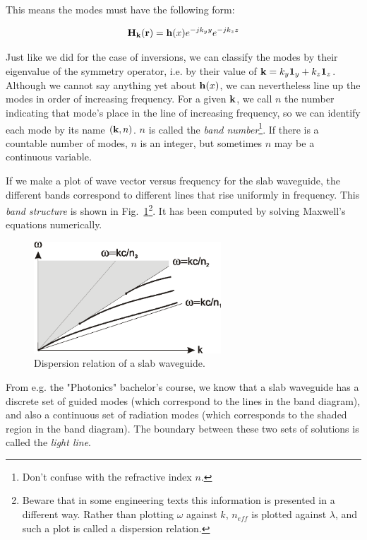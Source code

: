 This means the modes must have the following form:

\begin{equation}
{\bf H}_{\bf k}({\bf r}) = {\bf h}(x) e^{-j k_y y} e^{-j k_z z} 
\end{equation} 

Just like we did for the case of inversions, we can classify the modes by their eigenvalue of the symmetry operator, i.e. by their value of ${\bf k} = k_y {\bf 1}_y + k_z {\bf 1}_z$. Although we cannot say anything yet about ${\bf h}(x)$, we can nevertheless line up the modes in order of increasing frequency. For a given ${\bf k}$, we call $n$ the number indicating that mode's place in the line of increasing frequency, so we can identify each mode by its name $({\bf k},n)$.
$n$ is called the \emph{band number}\footnote{Don't confuse with the refractive index $n$.}. If there is a countable number of modes, $n$ is an integer, but sometimes $n$ may be a continuous variable. 

If we make a plot of wave vector versus frequency for the slab waveguide, the different bands correspond to different lines that rise uniformly in frequency. This \emph{band structure} is shown in Fig.~\ref{fig-slab-disp}\footnote{Beware that in some engineering texts this information is presented in a different way. Rather than plotting $\omega$ against $k$, $n_{eff}$ is plotted against $\lambda$, and such a plot is called a dispersion relation.}. It has been computed by solving Maxwell's equations numerically.

\begin{figure}
\centering
\includegraphics[width=7cm]{periodic/figures/slabdisp}
\caption{Dispersion relation of a slab waveguide.}
\label{fig-slab-disp}
\end{figure}

From e.g. the "Photonics" bachelor's course, we know that a slab waveguide has a discrete set of guided modes (which correspond to the lines in the band diagram), and also a continuous set of radiation modes (which corresponds to the shaded region in the band diagram). The boundary between these two sets of solutions is called the \emph{light line}.

